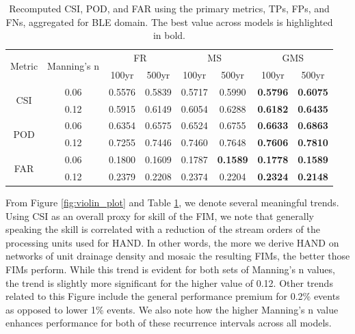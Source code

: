 \documentclass[draft]{dependencies/agujournal2019}
\begin{document}
%
\begin{table}[h!]
\caption{Recomputed CSI, POD, and FAR using the primary metrics, TPs, FPs, and FNs, aggregated for BLE domain.
         The best value across models is highlighted in bold.}
\label{tab:aggregate_metrics}
\centering
\begin{tabular}{|c|c||c|c|c|c|c|c|}
\hline
\multirow{2}{*}{Metric} & \multirow{2}{*}{Manning's n} & \multicolumn{2}{|c|}{FR} & \multicolumn{2}{|c|}{MS} & \multicolumn{2}{|c|}{GMS} \\
\cline{3-8}
  &  & 100yr & 500yr & 100yr & 500yr & 100yr & 500yr \\
\hline
\multirow{2}{*}{CSI} & 0.06 & 0.5576 & 0.5839 & 0.5717 & 0.5990 & \textbf{0.5796} & \textbf{0.6075} \\
\cline{2-8}
  & 0.12 & 0.5915 & 0.6149 & 0.6054 & 0.6288 & \textbf{0.6182} & \textbf{0.6435} \\
\hline
\multirow{2}{*}{POD} & 0.06 & 0.6354 & 0.6575 & 0.6524 & 0.6755 & \textbf{0.6633} & \textbf{0.6863} \\
\cline{2-8}
  & 0.12 & 0.7255 & 0.7446 & 0.7460 & 0.7648 & \textbf{0.7606} & \textbf{0.7810} \\
\hline
\multirow{2}{*}{FAR} & 0.06 & 0.1800 & 0.1609 & 0.1787 & \textbf{0.1589} & \textbf{0.1778} & \textbf{0.1589} \\
\cline{2-8}
  & 0.12 & 0.2379 & 0.2208 & 0.2374 & 0.2204 & \textbf{0.2324} & \textbf{0.2148} \\
\hline
\end{tabular}
\end{table}
%
From Figure \ref{fig:violin_plot} and Table \ref{tab:aggregate_metrics}, we denote several meaningful trends. 
Using CSI as an overall proxy for skill of the FIM, we note that generally speaking the skill is correlated with a reduction of the stream orders of the processing units used for HAND.
In other words, the more we derive HAND on networks of unit drainage density and mosaic the resulting FIMs, the better those FIMs perform.
While this trend is evident for both sets of Manning's n values, the trend is slightly more significant for the higher value of 0.12.
Other trends related to this Figure include the general performance premium for 0.2\% events as opposed to lower 1\% events.
We also note how the higher Manning's n value enhances performance for both of these recurrence intervals across all models.
\end{document}
